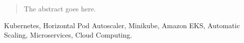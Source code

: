 \begin{abstract}
The abstract goes here.
\end{abstract}

\begin{IEEEkeywords}
Kubernetes, Horizontal Pod Autoscaler, Minikube, Amazon EKS, Automatic Scaling, Microservices, Cloud Computing.
\end{IEEEkeywords}

%
\IEEEpeerreviewmaketitle
